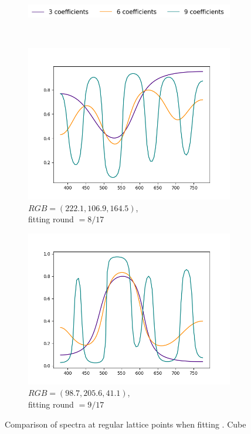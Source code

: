 \begin{figure}[t]
	\centering
	\captionsetup[subfigure]{font=footnotesize,labelfont=footnotesize}
	\captionsetup[subfigure]{justification=centering}
	\begin{subfigure}[t]{0.60\textwidth}
		\includegraphics[width=\linewidth]{img/results_noOfMoments_regularPts_legend.png}
	\end{subfigure} \\
	\begin{subfigure}[t]{0.45\textwidth}
		\includegraphics[width=\linewidth]{img/results_noOfMoments_regularPts_1.png}
		\caption{$RGB=(222.1, 106.9, 164.5)$,\\ fitting round $= 8/17$}
	\end{subfigure}
	\begin{subfigure}[t]{0.45\textwidth}
		\includegraphics[width=\linewidth]{img/results_noOfMoments_regularPts_2.png}
		\caption{$RGB=(98.7, 205.6, 41.1)$,\\ fitting round $= 9/17$}
	\end{subfigure} 
	\caption{Comparison of spectra at regular lattice points when fitting . Cube }
	\label{fig:noOfMoments_regularPoints}
\end{figure}

